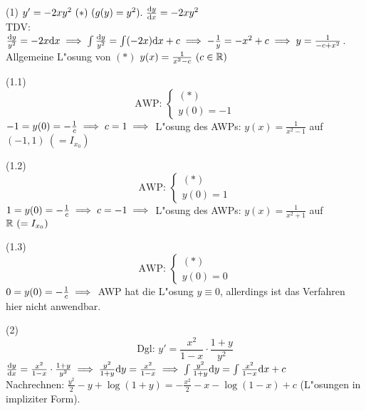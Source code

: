 \documentclass{article}
\begin{document}
\begin{beispiele}
\item[(1)] $y'=-2xy^2\ (*)\ (g(y)=y^2).\ \frac{\ud y}{\ud x}=-2xy^2$\\
TDV: $\frac{\mathrm{d} y}{y^2}=-2x\mathrm{d} x\implies\int\frac{\mathrm{d} y}{y^2}=\int(-2x)\mathrm{d} x+c\implies -\frac{1}{y}=-x^2+c\implies y=\frac{1}{-c+x^2}$. Allgemeine L"osung von $(*)$ $y(x)=\frac{1}{x^2-c}\ (c\in\mathbb{R})$
\item[(1.1)] $$\text{AWP: }\begin{cases} (*) \\ y(0)=-1\end{cases}$$
	$-1=y(0)=-\frac{1}{c}\implies c=1\implies$ L"osung des AWPs: $y(x)=\frac{1}{x^2-1}$ auf $(-1,1)\ (=I_{x_0})$
\item[(1.2)] $$\text{AWP: }\begin{cases} (*) \\ y(0)=1\end{cases}$$
	$1=y(0)=-\frac{1}{c}\implies c=-1\implies$ L"osung des AWPs: $y(x)=\frac{1}{x^2+1}$ auf $\mathbb{R}\ (=I_{x_0})$
\item[(1.3)] $$\text{AWP: }\begin{cases} (*) \\ y(0)=0\end{cases}$$
	$0=y(0)=-\frac{1}{c}\implies$ AWP hat die L"osung $y\equiv 0$, allerdings ist das Verfahren hier nicht anwendbar.
\item[(2)]$$\text{Dgl: }y'=\frac{x^2}{1-x}\cdot\frac{1+y}{y^2}$$ $\frac{\mathrm{d} y}{\mathrm{d} x}=\frac{x^2}{1-x}\cdot\frac{1+y}{y^2}\implies
	\frac{y^2}{1+y}\mathrm{d} y=\frac{x^2}{1-x}\implies\int\frac{y^2}{1+y}\mathrm{d} y=\int\frac{x^2}{1-x}\mathrm{d} x+c$\\
	Nachrechnen: $\frac{y^2}{2}-y+\log(1+y)=-\frac{x^2}{2}-x-\log(1-x)+c$ (L"osungen in impliziter Form).
\end{beispiele}
\end{document}
